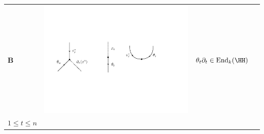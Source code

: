 \documentclass[english,letter paper,12pt,leqno]{article}
\theoremstyle{example}
\numberwithin{equation}{section}
\DeclareMathOperator{\End}{End}
\begin{document}
\begin{center}
\begin{tabular}{ >{\centering}m{1cm} >{\centering}m{4cm} >{\centering}m{8cm} >{\centering}m{1cm}}
\textbf{B}
&
\includegraphics[scale=0.4]{dia3}
&
$\theta_t \partial_t \in \End_k( \HH )$\\
\vspace{0.5cm}
$1 \le t \le n$
&
\tagarray{\label{interaction_2}}
\end{tabular}
\end{center}
\end{document}
